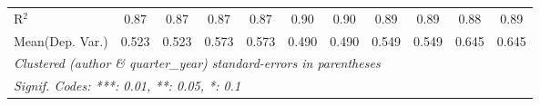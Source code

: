 \begin{tabular}{lcccccccccc}
   R$^2$                                    & 0.87          & 0.87           & 0.87          & 0.87           & 0.90    & 0.90    & 0.89          & 0.89           & 0.88         & 0.89\\  
Mean(Dep. Var.) & 0.523 & 0.523 & 0.573 & 0.573 & 0.490 & 0.490 & 0.549 & 0.549 & 0.645 & 0.645 \\
   \midrule \midrule
   \multicolumn{11}{l}{\emph{Clustered (author \& quarter\_year) standard-errors in parentheses}}\\
   \multicolumn{11}{l}{\emph{Signif. Codes: ***: 0.01, **: 0.05, *: 0.1}}\\
\end{tabular}
\par\endgroup
